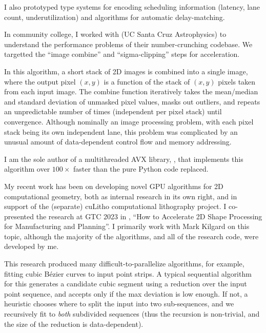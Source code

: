 I also prototyped type systems for encoding scheduling information
(latency, lane count, underutilization) and algorithms for automatic
delay-matching.

In community college, I worked
with  (UC Santa Cruz Astrophysics) to understand the performance
problems of their number-crunching codebase. We targetted the ``image
combine'' and ``sigma-clipping'' steps for acceleration.

In this algorithm, a short stack of 2D images is combined into a
single image, where the output pixel $(x,y)$ is a function of the
stack of $(x,y)$ pixels taken from each input image.  The combine
function iteratively takes the mean/median and standard deviation of
unmasked pixel values, masks out outliers, and repeats an
unpredictable number of times (independent per pixel stack) until
convergence. Although nominally an image processing problem, with each
pixel stack being its own independent lane, this problem was
complicated by an unusual amount of data-dependent control flow and
memory addressing.

I am the sole author of a multithreaded AVX
library, ,
that implements this algorithm over $100\times$ faster than the pure
Python code replaced.

\filbreak

My recent work has been on developing novel GPU algorithms for 2D
computational geometry, both as internal research in its own right,
and in support of the (separate) cuLitho computational lithography
project. I co-presented the research at GTC 2023
in , ``How to Accelerate 2D Shape Processing for Manufacturing and
Planning''. I primarily work with Mark Kilgard on this topic, although
the majority of the algorithms, and all of the research code, were
developed by me.

This research produced many difficult-to-parallelize algorithms, for
example, fitting cubic Bézier curves to input point strips. A typical
sequential algorithm for this generates a candidate cubic segment
using a reduction over the input point sequence, and accepts only if
the max deviation is low enough. If not, a heuristic chooses where to
split the input into two sub-sequences, and we recursively fit
to \textit{both} subdivided sequences (thus the recursion is
non-trivial, and the size of the reduction is data-dependent).

